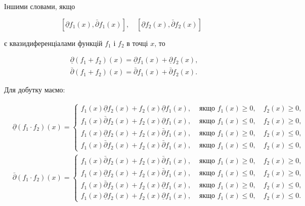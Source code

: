 \documentclass[10pt]{article}
\begin{document}
Іншими словами, якщо

$$
\left[\underline{\partial} f_{1}(x), \bar{\partial} f_{1}(x)\right], \quad\left[\underline{\partial} f_{2}(x), \bar{\partial} f_{2}(x)\right]
$$

є квазидиференціалами функцій $f_{1}$ і $f_{2}$ в точці $x$, то

$$
\begin{aligned}
& \underline{\partial}\left(f_{1}+f_{2}\right)(x)=\underline{\partial} f_{1}(x)+\underline{\partial} f_{2}(x), \\
& \bar{\partial}\left(f_{1}+f_{2}\right)(x)=\bar{\partial} f_{1}(x)+\bar{\partial} f_{2}(x) .
\end{aligned}
$$

Для добутку маємо:

$$
\begin{aligned}
& \underline{\partial}\left(f_{1} \cdot f_{2}\right)(x)= \begin{cases}f_{1}(x) \underline{\partial} f_{2}(x)+f_{2}(x) \underline{\partial} f_{1}(x), & \text { якщо } f_{1}(x) \geq 0, \quad f_{2}(x) \geq 0, \\
f_{1}(x) \bar{\partial} f_{2}(x)+f_{2}(x) \underline{\partial} f_{1}(x), & \text { якщо } f_{1}(x) \leq 0, \quad f_{2}(x) \geq 0, \\
f_{1}(x) \underline{\partial} f_{2}(x)+f_{2}(x) \bar{\partial} f_{1}(x), & \text { якщо } f_{1}(x) \geq 0, \quad f_{2}(x) \leq 0, \\
f_{1}(x) \bar{\partial} f_{2}(x)+f_{2}(x) \bar{\partial} f_{1}(x), & \text { якщо } f_{1}(x) \leq 0, \quad f_{2}(x) \leq 0,\end{cases} \\
& \bar{\partial}\left(f_{1} \cdot f_{2}\right)(x)= \begin{cases}f_{1}(x) \bar{\partial} f_{2}(x)+f_{2}(x) \bar{\partial} f_{1}(x), & \text { якщо } f_{1}(x) \geq 0, \quad f_{2}(x) \geq 0, \\
f_{1}(x) \underline{\partial} f_{2}(x)+f_{2}(x) \bar{\partial} f_{1}(x), & \text { якщо } f_{1}(x) \leq 0, \quad f_{2}(x) \geq 0, \\
f_{1}(x) \bar{\partial} f_{2}(x)+f_{2}(x) \underline{\partial} f_{1}(x), & \text { якщо } f_{1}(x) \geq 0, \quad f_{2}(x) \leq 0, \\
f_{1}(x) \underline{\partial} f_{2}(x)+f_{2}(x) \underline{\partial} f_{1}(x), & \text { якщо } f_{1}(x) \leq 0, \quad f_{2}(x) \leq 0 .\end{cases}
\end{aligned}
$$
\end{document}
